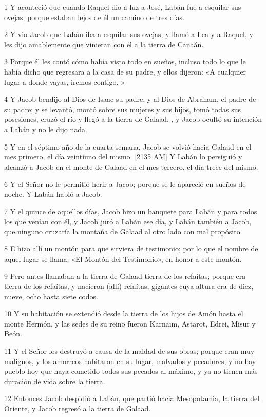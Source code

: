 \par 1 Y aconteció que cuando Raquel dio a luz a José, Labán fue a esquilar sus ovejas; porque estaban lejos de él un camino de tres días.
\par 2 Y vio Jacob que Labán iba a esquilar sus ovejas, y llamó a Lea y a Raquel, y les dijo amablemente que vinieran con él a la tierra de Canaán.
\par 3 Porque él les contó cómo había visto todo en sueños, incluso todo lo que le había dicho que regresara a la casa de su padre, y ellos dijeron: «A cualquier lugar a donde vayas, iremos contigo. »
\par 4 Y Jacob bendijo al Dios de Isaac su padre, y al Dios de Abraham, el padre de su padre; y se levantó, montó sobre sus mujeres y sus hijos, tomó todas sus posesiones, cruzó el río y llegó a la tierra de Galaad. , y Jacob ocultó su intención a Labán y no le dijo nada.
\par 5 Y en el séptimo año de la cuarta semana, Jacob se volvió hacia Galaad en el mes primero, el día veintiuno del mismo. [2135 AM] Y Labán lo persiguió y alcanzó a Jacob en el monte de Galaad en el mes tercero, el día trece del mismo.
\par 6 Y el Señor no le permitió herir a Jacob; porque se le apareció en sueños de noche. Y Labán habló a Jacob.
\par 7 Y el quince de aquellos días, Jacob hizo un banquete para Labán y para todos los que venían con él, y Jacob juró a Labán ese día, y Labán también a Jacob, que ninguno cruzaría la montaña de Galaad al otro lado con mal propósito.
\par 8 E hizo allí un montón para que sirviera de testimonio; por lo que el nombre de aquel lugar se llama: «El Montón del Testimonio», en honor a este montón.
\par 9 Pero antes llamaban a la tierra de Galaad tierra de los refaítas; porque era tierra de los refaítas, y nacieron (allí) refaítas, gigantes cuya altura era de diez, nueve, ocho hasta siete codos.
\par 10 Y su habitación se extendió desde la tierra de los hijos de Amón hasta el monte Hermón, y las sedes de su reino fueron Karnaim, Astarot, Edrei, Misur y Beón.
\par 11 Y el Señor los destruyó a causa de la maldad de sus obras; porque eran muy malignos, y los amorreos habitaron en su lugar, malvados y pecadores, y no hay pueblo hoy que haya cometido todos sus pecados al máximo, y ya no tienen más duración de vida sobre la tierra.
\par 12 Entonces Jacob despidió a Labán, que partió hacia Mesopotamia, la tierra del Oriente, y Jacob regresó a la tierra de Galaad.
